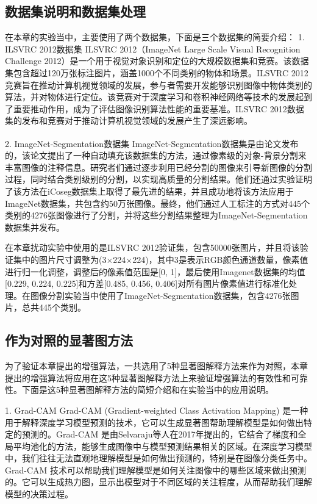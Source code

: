 \subsection{数据集说明和数据集处理}
在本章的实验当中，主要使用了两个数据集，下面是三个数据集的简要介绍：
1. ILSVRC 2012数据集
ILSVRC 2012（ImageNet Large Scale Visual Recognition Challenge 2012）是一个用于视觉对象识别和定位的大规模数据集和竞赛。该数据集包含超过120万张标注图片，涵盖1000个不同类别的物体和场景。ILSVRC 2012竞赛旨在推动计算机视觉领域的发展，参与者需要开发能够识别图像中物体类别的算法，并对物体进行定位。该竞赛对于深度学习和卷积神经网络等技术的发展起到了重要推动作用，成为了评估图像识别算法性能的重要基准。ILSVRC 2012数据集的发布和竞赛对于推动计算机视觉领域的发展产生了深远影响。

2. ImageNet-Segmentation数据集
ImageNet-Segmentation数据集是由论文\textsuperscript{\cite{guillaumin2014imagenet}}发布的，该论文提出了一种自动填充该数据集的方法，通过像素级的对象-背景分割来丰富图像的注释信息。研究者们通过逐步利用已经分割的图像来引导新图像的分割过程，同时结合类别级别的分割，以实现高质量的分割结果。他们还通过实验证明了该方法在iCoseg数据集上取得了最先进的结果，并且成功地将该方法应用于ImageNet数据集，共包含约50万张图像。最终，他们通过人工标注的方式对445个类别的4276张图像进行了分割，并将这些分割结果整理为ImageNet-Segmentation数据集并发布。

在本章扰动实验中使用的是ILSVRC 2012验证集，包含50000张图片，并且将该验证集中的图片尺寸调整为(3$\times$224$\times$224)，其中$3$是表示RGB颜色通道数量，像素值进行归一化调整，调整后的像素值范围是[0, 1]，最后使用Imagenet数据集的均值[0.229, 0.224, 0.225]和方差[0.485, 0.456, 0.406]对所有图片像素值进行标准化处理。在图像分割实验当中使用了ImageNet-Segmentation数据集，包含4276张图片，总共445个类别。
\subsection{作为对照的显著图方法}
为了验证本章提出的增强算法，一共选用了5种显著图解释方法来作为对照，本章提出的增强算法将应用在这5种显著图解释方法上来验证增强算法的有效性和可靠性。下面是这5种显著图解释方法的简短介绍和在实验当中的应用说明。

1. Grad-CAM
Grad-CAM (Gradient-weighted Class Activation Mapping) 是一种用于解释深度学习模型预测的技术，它可以生成显著图帮助理解模型是如何做出特定的预测的。Grad-CAM 是由Selvaraju等人在2017年提出的，它结合了梯度和全局平均池化的方法，能够生成图像中与模型预测结果相关的区域。在深度学习模型中，我们往往无法直观地理解模型是如何做出预测的，特别是在图像分类任务中。Grad-CAM 技术可以帮助我们理解模型是如何关注图像中的哪些区域来做出预测的。它可以生成热力图，显示出模型对于不同区域的关注程度，从而帮助我们理解模型的决策过程。

